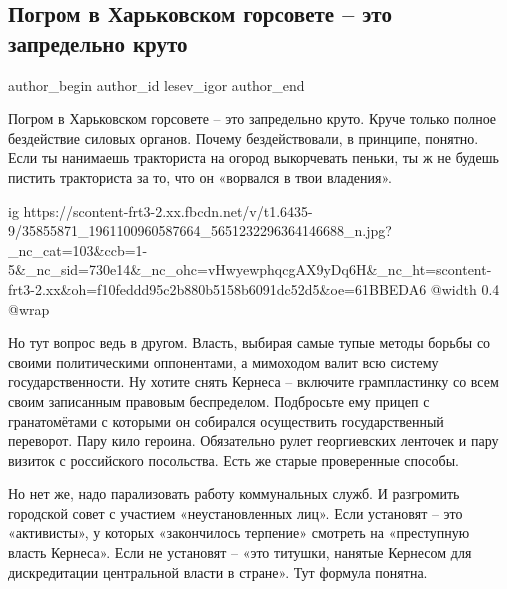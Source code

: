  
 
 
 
 
 
\subsection{Погром в Харьковском горсовете – это запредельно круто}
\label{sec:21_06_2018.fb.lesev_igor.1.pogrom_v_harjkovskom_gorsovete}
 
\ifcmt
 author_begin
   author_id lesev_igor
 author_end
\fi

Погром в Харьковском горсовете – это запредельно круто. Круче только полное
бездействие силовых органов. Почему бездействовали, в принципе, понятно. Если
ты нанимаешь тракториста на огород выкорчевать пеньки, ты ж не будешь пистить
тракториста за то, что он «ворвался в твои владения».

\ifcmt
  ig https://scontent-frt3-2.xx.fbcdn.net/v/t1.6435-9/35855871_1961100960587664_5651232296364146688_n.jpg?_nc_cat=103&ccb=1-5&_nc_sid=730e14&_nc_ohc=vHwyewphqcgAX9yDq6H&_nc_ht=scontent-frt3-2.xx&oh=f10feddd95c2b880b5158b6091dc52d5&oe=61BBEDA6
  @width 0.4
  @wrap 
\fi

Но тут вопрос ведь в другом. Власть, выбирая самые тупые методы борьбы со
своими политическими оппонентами, а мимоходом валит всю систему
государственности. Ну хотите снять Кернеса – включите грампластинку со всем
своим записанным правовым беспределом. Подбросьте ему прицеп с гранатомётами с
которыми он собирался осуществить государственный переворот. Пару кило героина.
Обязательно рулет георгиевских ленточек и пару визиток с российского
посольства. Есть же старые проверенные способы.

Но нет же, надо парализовать работу коммунальных служб. И разгромить городской
совет с участием «неустановленных лиц». Если установят – это «активисты», у
которых «закончилось терпение» смотреть на «преступную власть Кернеса». Если не
установят – «это титушки, нанятые Кернесом для дискредитации центральной власти
в стране». Тут формула понятна.

